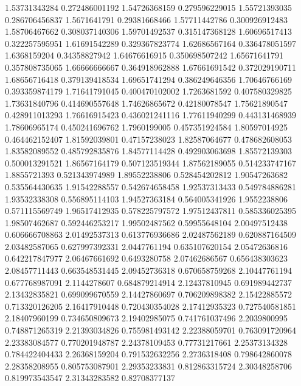   1.53731343284   0.272486001192
  1.54726368159   0.279596229015
  1.55721393035   0.286706456837
   1.5671641791    0.29381668466
  1.57711442786   0.300926912483
  1.58706467662   0.308037140306
  1.59701492537   0.315147368128
  1.60696517413   0.322257595951
  1.61691542289   0.329367823774
  1.62686567164   0.336478051597
   1.6368159204    0.34358827942
  1.64676616915   0.350698507242
  1.65671641791   0.357808735065
  1.66666666667   0.364918962888
  1.67661691542   0.372029190711
  1.68656716418   0.379139418534
  1.69651741294   0.386249646356
  1.70646766169   0.393359874179
  1.71641791045   0.400470102002
   1.7263681592   0.407580329825
  1.73631840796   0.414690557648
  1.74626865672    0.42180078547
  1.75621890547   0.428911013293
  1.76616915423   0.436021241116
  1.77611940299   0.443131468939
  1.78606965174   0.450241696762
   1.7960199005   0.457351924584
  1.80597014925   0.464462152407
  1.81592039801    0.47157238023
  1.82587064677   0.478682608053
  1.83582089552   0.485792835876
  1.84577114428   0.492903063698
  1.85572139303   0.500013291521
  1.86567164179   0.507123519344
  1.87562189055   0.514233747167
   1.8855721393   0.521343974989
  1.89552238806   0.528454202812
  1.90547263682   0.535564430635
  1.91542288557   0.542674658458
  1.92537313433   0.549784886281
  1.93532338308   0.556895114103
  1.94527363184   0.564005341926
   1.9552238806   0.571115569749
  1.96517412935   0.578225797572
  1.97512437811   0.585336025395
  1.98507462687   0.592446253217
  1.99502487562    0.59955648104
  2.00497512438   0.606666708863
  2.01492537313   0.613776936686
  2.02487562189   0.620887164509
  2.03482587065   0.627997392331
   2.0447761194   0.635107620154
  2.05472636816   0.642217847977
  2.06467661692     0.6493280758
  2.07462686567   0.656438303623
  2.08457711443   0.663548531445
  2.09452736318   0.670658759268
  2.10447761194   0.677768987091
   2.1144278607   0.684879214914
  2.12437810945   0.691989442737
  2.13432835821   0.699099670559
  2.14427860697   0.706209898382
  2.15422885572   0.713320126205
  2.16417910448   0.720430354028
  2.17412935323   0.727540581851
  2.18407960199   0.734650809673
  2.19402985075   0.741761037496
   2.2039800995   0.748871265319
  2.21393034826   0.755981493142
  2.22388059701   0.763091720964
  2.23383084577   0.770201948787
  2.24378109453    0.77731217661
  2.25373134328   0.784422404433
  2.26368159204   0.791532632256
   2.2736318408   0.798642860078
  2.28358208955   0.805753087901
  2.29353233831   0.812863315724
  2.30348258706   0.819973543547
  2.31343283582    0.82708377137
